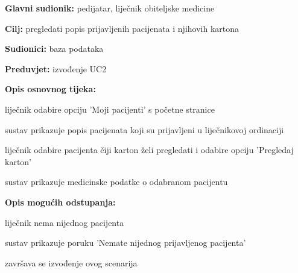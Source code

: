      
                    \noindent {}
					\begin{packed_item}
	
						\item \textbf{Glavni sudionik: }pedijatar, liječnik obiteljske medicine
						\item  \textbf{Cilj:} pregledati popis prijavljenih pacijenata i njihovih kartona
						\item  \textbf{Sudionici:} baza podataka
						\item  \textbf{Preduvjet:} izvođenje UC2
						\item  \textbf{Opis osnovnog tijeka:}
						
						\item[] \begin{packed_enum}
	
							\item liječnik odabire opciju 'Moji pacijenti' s početne stranice
							\item sustav prikazuje popis pacijenata koji su prijavljeni u liječnikovoj ordinaciji
							\item liječnik odabire pacijenta čiji karton želi pregledati i odabire opciju 'Pregledaj karton'
							\item sustav prikazuje medicinske podatke o odabranom pacijentu
						\end{packed_enum}
						
						\item  \textbf{Opis mogućih odstupanja:}
						
						\item[] \begin{packed_item}
	
							\item[2.a] liječnik nema nijednog pacijenta
							\item[] \begin{packed_enum}
								
								\item sustav prikazuje poruku 'Nemate nijednog prijavljenog pacijenta'
								\item završava se izvođenje ovog scenarija
							\end{packed_enum}
							
						\end{packed_item}
					\end{packed_item}


